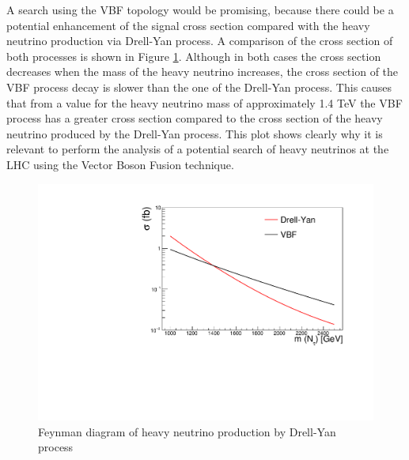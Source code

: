 A search using the VBF topology would be promising, because there could be a potential enhancement of the signal cross section compared with the heavy neutrino production via Drell-Yan process. A comparison of the cross section of both processes is shown in Figure \ref{fig: DY vs VBF}. Although in both cases the cross section decreases when the mass of the heavy neutrino increases, the cross section of the VBF process decay is slower than the one of the Drell-Yan process. This causes that from a value for the heavy neutrino mass of approximately 1.4 TeV the VBF process has a greater cross section compared to the cross section of the heavy neutrino produced by the Drell-Yan process. This plot shows clearly why it is relevant to perform the analysis of a potential search of heavy neutrinos at the LHC using the Vector Boson Fusion technique.

\begin{figure}[H]
\centering
\includegraphics[width=\linewidth]{DY_vs_VBF_HN}
\caption{Feynman diagram of heavy neutrino production by Drell-Yan process}
\label{fig: DY vs VBF}
\end{figure}

